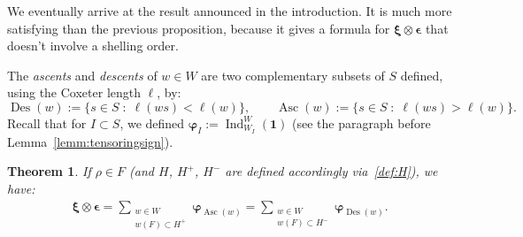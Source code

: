 \documentclass[11pt]{article}
\newtheorem{theo}{Theorem}[section]
\theoremstyle{definition}
\DeclareMathOperator{\des}{Des}
\DeclareMathOperator{\asc}{Asc}
\DeclareMathOperator{\Ind}{Ind}
\newcommand{\bphi}{\boldsymbol{\varphi}}
\newcommand{\bxi}{\boldsymbol{\xi}}
\newcommand{\bepsilon}{\boldsymbol{\epsilon}}
\newcommand{\triv}{\mathbf{1}}
\begin{document}
We eventually arrive at the result announced in the introduction.  It is much more satisfying than the previous proposition, because it gives a formula for $\bxi\otimes\bepsilon$ that doesn't involve a shelling order.

The {\it ascents} and {\it descents} of $w \in W$ are two complementary subsets of $S$ defined, using the Coxeter length $\ell$, by:
\[
    \des(w) :=
    \{
        s \in S \;:\; \ell(ws) < \ell(w)    
    \},
    \qquad    
    \asc(w) :=
    \{
        s \in S \;:\; \ell(ws) > \ell(w)    
    \}.
\]
Recall that for $I\subset S$, we defined $\bphi_I := \Ind_{W_I}^W (\triv)$ (see the paragraph before Lemma~\ref{lemm:tensoringsign}).

\begin{theo} \label{theo4}
    If $\rho \in F$ (and $H$, $H^+$, $H^-$ are defined accordingly via~\eqref{def:H}), we have:
    \begin{align} \label{eq:theo_desc_asc}
        \bxi \otimes \bepsilon
        =
        \sum_{\substack{w\in W \\ w(F) \subset H^+}}
        \bphi_{\asc(w)}
        =
        \sum_{\substack{w\in W \\ w(F) \subset H^-}}
        \bphi_{\des(w)}.
    \end{align}
\end{theo}
\end{document}
